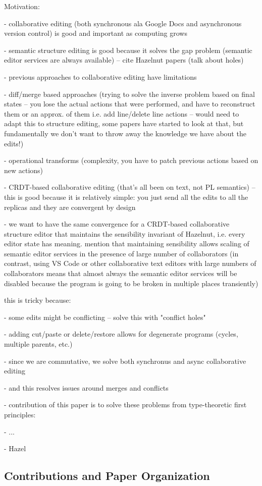 
\newpage




Motivation:

- collaborative editing (both synchronous ala Google Docs and asynchronous version control)
is good and important as computing grows

- semantic structure editing is good because it solves the gap problem (semantic editor services
are always available) -- cite Hazelnut papers (talk about holes)

- previous approaches to collaborative editing have limitations

- diff/merge based approaches (trying to solve the inverse problem based on final states --
you lose the actual actions that were performed, and have to reconstruct them or an approx.
of them i.e. add line/delete line actions -- would need to adapt this to structure editing,
some papers have started to look at that, but fundamentally we don't want to throw away the
knowledge we have about the edits!)

- operational transforms (complexity, you have to patch previous actions based on new actions)

- CRDT-based collaborative editing (that's all been on text, not PL semantics) -- this is good
because it is relatively simple: you just send all the edits to all the replicas and they are
convergent by design

- we want to have the same convergence for a CRDT-based collaborative structure editor that maintains
the sensibility invariant of Hazelnut, i.e. every editor state has meaning. mention that maintaining sensibility
allows scaling of semantic editor services in the presence of large number of collaborators (in contrast,
using VS Code or other collaborative text editors with large numbers of collaborators means that almost always
the semantic editor services will be disabled because the program is going to be broken in multiple places
transiently)

this is tricky because:

- some edits might be conflicting -- solve this with "conflict holes"

- adding cut/paste or delete/restore allows for degenerate programs (cycles, multiple parents, etc.)

- since we are commutative, we solve both synchronus and async collaborative editing

- and this resolves issues around merges and conflicts

- contribution of this paper is to solve these problems from type-theoretic first principles:

- ...

- Hazel

\subsection{Contributions and Paper Organization}%
\label{sec:Contributions and Paper Organization}
